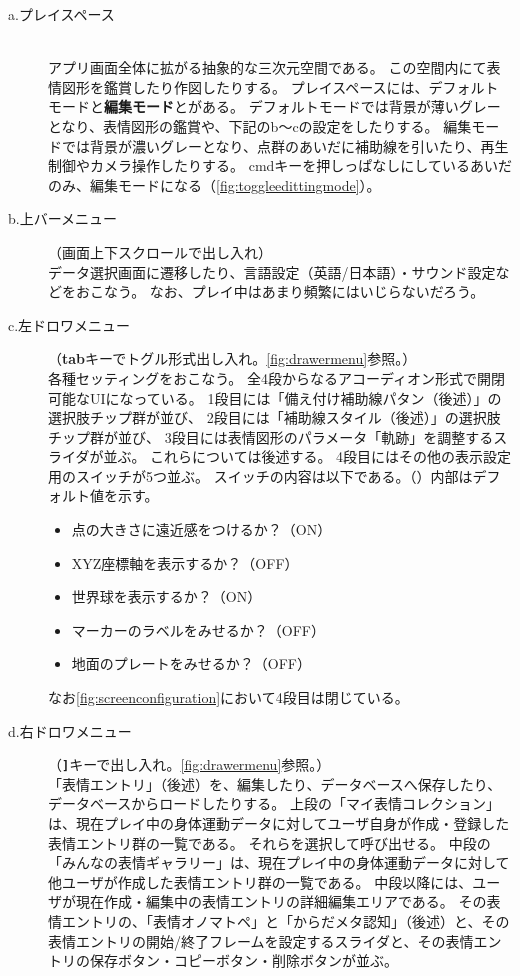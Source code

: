 \begin{description}
  \item[a.プレイスペース]\mbox{}\\
  アプリ画面全体に拡がる抽象的な三次元空間である。
  この空間内にて表情図形を鑑賞したり作図したりする。
  プレイスペースには、デフォルトモードと\textbf{編集モード}とがある。
  デフォルトモードでは背景が薄いグレーとなり、表情図形の鑑賞や、下記のb〜cの設定をしたりする。
  編集モードでは背景が濃いグレーとなり、点群のあいだに補助線を引いたり、再生制御やカメラ操作したりする。
  cmdキーを押しっぱなしにしているあいだのみ、編集モードになる（\autoref{fig:toggleedittingmode}）。
  

  \item[b.上バーメニュー]（画面上下スクロールで出し入れ）\mbox{}\\
  データ選択画面に遷移したり、言語設定（英語/日本語）・サウンド設定などをおこなう。
  なお、プレイ中はあまり頻繁にはいじらないだろう。    
  
  \item[c.左ドロワメニュー]\mbox{（\textbf{tab}キーでトグル形式出し入れ。\autoref{fig:drawermenu}参照。）}\\  
  各種セッティングをおこなう。
  全4段からなるアコーディオン形式で開閉可能なUIになっている。
  1段目には「備え付け補助線パタン（後述）」の選択肢チップ群が並び、
  2段目には「補助線スタイル（後述）」の選択肢チップ群が並び、
  3段目には表情図形のパラメータ「軌跡」を調整するスライダが並ぶ。
  これらについては後述する。
  4段目にはその他の表示設定用のスイッチが5つ並ぶ。
  スイッチの内容は以下である。（）内部はデフォルト値を示す。
  \begin{itemize}
    \item 点の大きさに遠近感をつけるか？（ON）
    \item XYZ座標軸を表示するか？（OFF）
    \item 世界球を表示するか？（ON）
    \item マーカーのラベルをみせるか？（OFF）
    \item 地面のプレートをみせるか？（OFF）
  \end{itemize}
  なお\autoref{fig:screenconfiguration}において4段目は閉じている。

  \item[d.右ドロワメニュー]\mbox{（\textbf{\texttt{]}}キーで出し入れ。\autoref{fig:drawermenu}参照。）}\\
  「表情エントリ」（後述）を、編集したり、データベースへ保存したり、データベースからロードしたりする。
  上段の「マイ表情コレクション」は、現在プレイ中の身体運動データに対してユーザ自身が作成・登録した表情エントリ群の一覧である。
  それらを選択して呼び出せる。
  中段の「みんなの表情ギャラリー」は、現在プレイ中の身体運動データに対して他ユーザが作成した表情エントリ群の一覧である。
  中段以降には、ユーザが現在作成・編集中の表情エントリの詳細編集エリアである。
  その表情エントリの、「表情オノマトペ」と「からだメタ認知」（後述）と、その表情エントリの開始/終了フレームを設定するスライダと、その表情エントリの保存ボタン・コピーボタン・削除ボタンが並ぶ。

\end{description}

